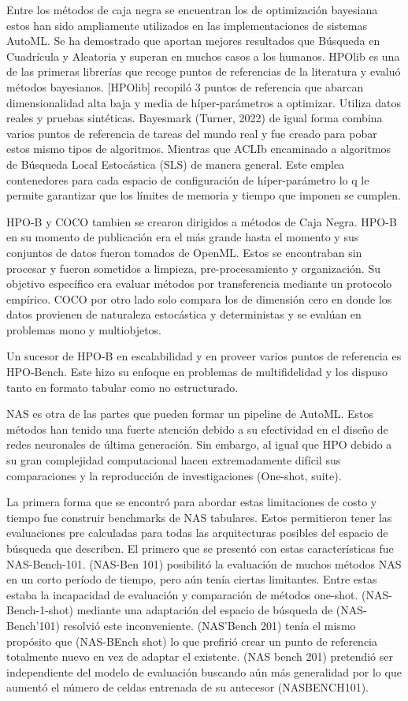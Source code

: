Entre los métodos de caja negra se encuentran los de optimización bayesiana estos han sido ampliamente utilizados en las implementaciones de sistemas AutoML. Se ha 
demostrado que aportan mejores resultados que Búsqueda en Cuadrícula y Aleatoria y superan en muchos casos a los humanos. HPOlib es una de las primeras librerías que 
recoge puntos de referencias de la literatura y evaluó métodos bayesianos.  [HPOlib] recopiló 3 puntos de referencia que abarcan dimensionalidad alta baja y media de 
híper-parámetros a optimizar. Utiliza datos reales y pruebas sintéticas. Bayesmark (Turner,  2022) de igual forma combina varios puntos de referencia de tareas del 
mundo real y fue creado para pobar estos mismo tipos de algoritmos. Mientras que ACLIb encaminado a algoritmos de Búsqueda Local Estocástica (SLS) de manera 
general. Este emplea contenedores para cada espacio de configuración de híper-parámetro lo q le permite garantizar que los límites de memoria y tiempo que imponen se 
cumplen. 

HPO-B y COCO tambien se crearon dirigidos a métodos de Caja Negra. HPO-B  en su momento de publicación era el más grande hasta el momento y sus conjuntos de datos fueron tomados de OpenML. Estos se encontraban sin procesar y fueron sometidos a limpieza, pre-procesamiento y organización. 
Su objetivo específico era evaluar métodos por transferencia mediante un protocolo empírico. COCO por otro lado solo compara los de dimensión cero en donde los datos 
provienen de naturaleza estocástica y deterministas y se evalúan en problemas mono y multiobjetos.

Un sucesor de HPO-B en escalabilidad y en proveer varios puntos de referencia es HPO-Bench. Este hizo su enfoque en problemas de multifidelidad y los dispuso tanto en 
formato tabular como no estructurado. 

NAS es otra de las partes que pueden formar un pipeline de AutoML. Estos métodos han tenido una fuerte atención debido a su efectividad en el diseño de redes neuronales 
de última generación. Sin embargo, al igual que HPO debido a su gran complejidad computacional hacen extremadamente difícil sus comparaciones y la reproducción de 
investigaciones (One-shot, suite).

La primera forma que se encontró para abordar estas limitaciones de costo y tiempo fue construir benchmarks de NAS tabulares. Estos permitieron tener las evaluaciones 
pre calculadas para todas las arquitecturas posibles del espacio de búsqueda que describen. El primero que se presentó con estas características fue NAS-Bench-101. 
(NAS-Ben 101) posibilitó la evaluación de muchos métodos NAS en un corto período de tiempo, pero aún tenía ciertas limitantes. Entre estas estaba la incapacidad de 
evaluación y comparación de métodos one-shot. (NAS-Bench-1-shot) mediante una adaptación del espacio de búsqueda de (NAS-Bench’101) resolvió este inconveniente. 
(NAS’Bench 201) tenía el mismo propósito que (NAS-BEnch shot) lo que prefirió crear un punto de referencia totalmente nuevo en vez de adaptar el existente. 
(NAS bench 201) pretendió ser independiente del modelo de evaluación buscando aún más generalidad por lo que aumentó el número de celdas entrenada de su antecesor 
(NASBENCH101).

